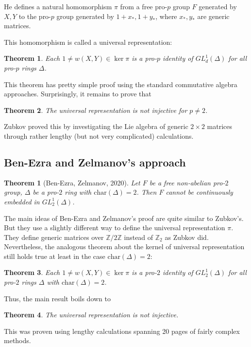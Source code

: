 \documentclass[12pt,a4paper]{article}
\newtheorem{theorem}{Theorem}[subsection]
\newtheorem*{theorem*}{Theorem}
\begin{document}
    He defines a natural homomorphism $\pi$ from a free pro-$p$ group $F$ generated by $X, Y$ to the pro-$p$ group generated by
    $1 + x_*, 1 + y_*$, where $x_*, y_*$ are generic matrices.

    This homomorphism is called a universal representation:
    \vskip 0.1in\noindent
    \begin{theorem}
        Each $1\neq w(X, Y) \in \ker \pi$ is a pro-$p$ identity of $GL^1_d(\Delta)$ for all pro-$p$ rings $\Delta$.
    \end{theorem}
    \vskip 0.1in\noindent
    This theorem has pretty simple proof using the standard commutative algebra approaches.
    Surprisingly, it remains to prove that
    \vskip 0.1in\noindent
    \begin{theorem}
        The universal representation is not injective for $p\neq 2$.
    \end{theorem}
    \vskip 0.1in\noindent
    Zubkov proved this by investigating the Lie algebra of generic $2\times 2$ matrices through rather lengthy (but not very complicated) calculations.

    \subsection{Ben-Ezra and Zelmanov's approach}
    \begin{theorem*}[Ben-Ezra, Zelmanov, 2020]
        Let $F$ be a free non-abelian pro-$2$ group, $\Delta$ be a pro-$2$ ring with $\mathrm{char}(\Delta)=2$.
        Then $F$ cannot be continuously embedded in $GL^1_2(\Delta)$.
    \end{theorem*}
    \vskip 0.1in\noindent

    The main ideas of Ben-Ezra and Zelmanov's proof are quite similar to Zubkov's.
    But they use a slightly different way to define the universal representation $\pi$.
    They define generic matrices over $\mathbb{Z}/2\mathbb{Z}$ instead of $\mathbb{Z}_2$ as Zubkov did.
    Nevertheless, the analogous theorem about the kernel of universal representation still holds true at least in the case $\mathrm{char}(\Delta)=2$:
    \vskip 0.1in\noindent
    \begin{theorem}
        Each $1\neq w(X, Y) \in \ker \pi$ is a pro-$2$ identity of $GL^1_2(\Delta)$ for all pro-$2$ rings $\Delta$ with $\mathrm{char}(\Delta)=2$.
    \end{theorem}
    \vskip 0.1in\noindent

    Thus, the main result boils down to
    \vskip 0.1in\noindent
    \begin{theorem}
        The universal representation is not injective.
    \end{theorem}
    \vskip 0.1in\noindent
    This was proven using lengthy calculations spanning 20 pages of fairly complex methods.
\end{document}
